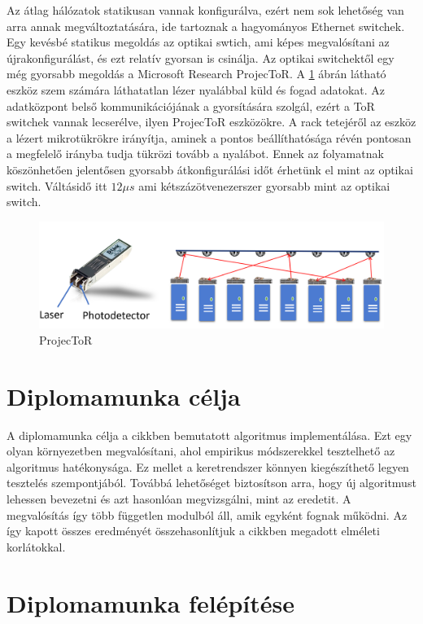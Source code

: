 \documentclass[12pt]{report}
\begin{document}
Az átlag hálózatok statikusan vannak konfigurálva, ezért nem sok lehetőség van arra annak megváltoztatására, ide tartoznak a hagyományos Ethernet switchek.
Egy kevésbé statikus megoldás az optikai swtich, ami képes megvalósítani az újrakonfigurálást, és ezt relatív gyorsan is csinálja.
Az optikai switchektől egy még gyorsabb megoldás a Microsoft Research ProjecToR. 
A \ref{projector-fig} ábrán látható eszköz szem számára láthatatlan lézer nyalábbal küld és fogad adatokat.
Az adatközpont belső kommunikációjának a gyorsítására szolgál, ezért a ToR switchek vannak lecserélve, ilyen ProjecToR eszközökre.
A rack tetejéről az eszköz a lézert mikrotükrökre irányítja, aminek a pontos beállíthatósága révén pontosan a megfelelő irányba tudja tükrözi tovább a nyalábot.
Ennek az folyamatnak köszönhetően jelentősen gyorsabb átkonfigurálási időt érhetünk el mint az optikai switch.
Váltásidő itt $12\mu s$ ami kétszázötvenezerszer gyorsabb mint az optikai switch.

\begin{figure}[h]
	\centering
	\includegraphics[width=0.9\linewidth]{pictures/laserswitch.png}
	\caption{ProjecToR}
	\label{projector-fig}
\end{figure}

\section{Diplomamunka célja}

A diplomamunka célja a cikkben \cite{avin_demand-aware_nodate} bemutatott algoritmus implementálása.
Ezt egy olyan környezetben megvalósítani, ahol empirikus módszerekkel tesztelhető az algoritmus hatékonysága.
Ez mellet a keretrendszer könnyen kiegészíthető legyen tesztelés szempontjából.
Továbbá lehetőséget biztosítson arra, hogy új algoritmust lehessen bevezetni és azt hasonlóan megvizsgálni, mint az eredetit.
A megvalósítás így több független modulból áll, amik egyként fognak működni.
Az így kapott összes eredményét összehasonlítjuk a cikkben megadott elméleti korlátokkal.

\section{Diplomamunka felépítése}
\end{document}
